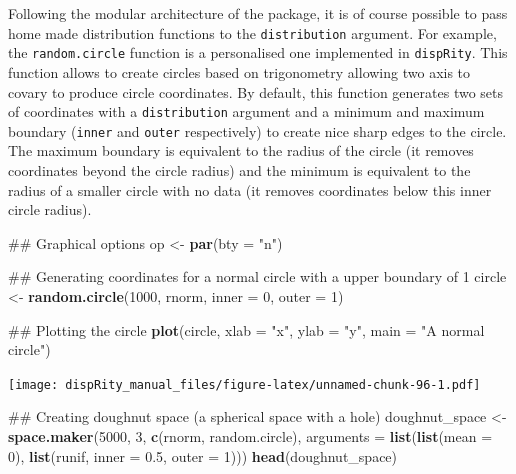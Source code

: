 \documentclass[]{book}
\newenvironment{Shaded}{\begin{snugshade}}{\end{snugshade}}
\newcommand{\KeywordTok}[1]{\textcolor[rgb]{0.13,0.29,0.53}{\textbf{#1}}}
\newcommand{\DataTypeTok}[1]{\textcolor[rgb]{0.13,0.29,0.53}{#1}}
\newcommand{\DecValTok}[1]{\textcolor[rgb]{0.00,0.00,0.81}{#1}}
\newcommand{\FloatTok}[1]{\textcolor[rgb]{0.00,0.00,0.81}{#1}}
\newcommand{\StringTok}[1]{\textcolor[rgb]{0.31,0.60,0.02}{#1}}
\newcommand{\NormalTok}[1]{#1}
\theoremstyle{definition}
\theoremstyle{definition}
\theoremstyle{definition}
\theoremstyle{remark}
\begin{document}
Following the modular architecture of the package, it is of course
possible to pass home made distribution functions to the
\texttt{distribution} argument. For example, the \texttt{random.circle}
function is a personalised one implemented in \texttt{dispRity}. This
function allows to create circles based on trigonometry allowing two
axis to covary to produce circle coordinates. By default, this function
generates two sets of coordinates with a \texttt{distribution} argument
and a minimum and maximum boundary (\texttt{inner} and \texttt{outer}
respectively) to create nice sharp edges to the circle. The maximum
boundary is equivalent to the radius of the circle (it removes
coordinates beyond the circle radius) and the minimum is equivalent to
the radius of a smaller circle with no data (it removes coordinates
below this inner circle radius).

\begin{Shaded}
\begin{Highlighting}[]
\NormalTok{## Graphical options}
\NormalTok{op <-}\StringTok{ }\KeywordTok{par}\NormalTok{(}\DataTypeTok{bty =} \StringTok{"n"}\NormalTok{)}

\NormalTok{## Generating coordinates for a normal circle with a upper boundary of 1}
\NormalTok{circle <-}\StringTok{ }\KeywordTok{random.circle}\NormalTok{(}\DecValTok{1000}\NormalTok{, rnorm, }\DataTypeTok{inner =} \DecValTok{0}\NormalTok{, }\DataTypeTok{outer =} \DecValTok{1}\NormalTok{)}

\NormalTok{## Plotting the circle}
\KeywordTok{plot}\NormalTok{(circle, }\DataTypeTok{xlab =} \StringTok{"x"}\NormalTok{, }\DataTypeTok{ylab =} \StringTok{"y"}\NormalTok{, }\DataTypeTok{main =} \StringTok{"A normal circle"}\NormalTok{)}
\end{Highlighting}
\end{Shaded}

\texttt{[image: dispRity\_manual\_files/figure-latex/unnamed-chunk-96-1.pdf]}

\begin{Shaded}
\begin{Highlighting}[]
\NormalTok{## Creating doughnut space (a spherical space with a hole)}
\NormalTok{doughnut_space <-}\StringTok{ }\KeywordTok{space.maker}\NormalTok{(}\DecValTok{5000}\NormalTok{, }\DecValTok{3}\NormalTok{, }\KeywordTok{c}\NormalTok{(rnorm, random.circle),}
     \DataTypeTok{arguments =} \KeywordTok{list}\NormalTok{(}\KeywordTok{list}\NormalTok{(}\DataTypeTok{mean =} \DecValTok{0}\NormalTok{), }\KeywordTok{list}\NormalTok{(runif, }\DataTypeTok{inner =} \FloatTok{0.5}\NormalTok{, }\DataTypeTok{outer =} \DecValTok{1}\NormalTok{)))}
\KeywordTok{head}\NormalTok{(doughnut_space)}
\end{Highlighting}
\end{Shaded}
\end{document}
